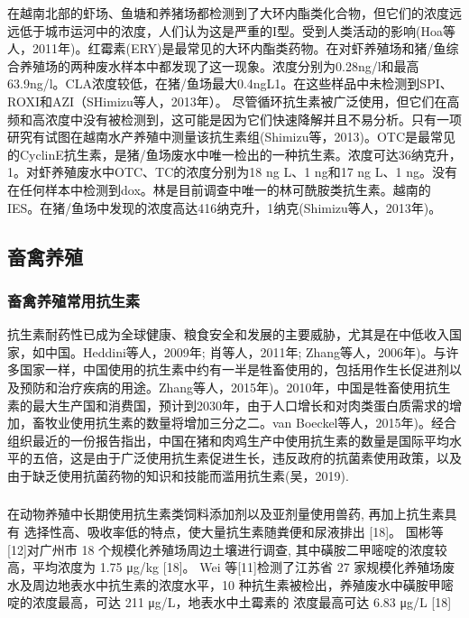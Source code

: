 \documentclass{SCIS2020cn}
\begin{document}
在越南北部的虾场、鱼塘和养猪场都检测到了大环内酯类化合物，但它们的浓度远远低于城市运河中的浓度，人们认为这是严重的I型。受到人类活动的影响(Hoa等人，2011年)。红霉素(ERY)是最常见的大环内酯类药物。在对虾养殖场和猪/鱼综合养殖场的两种废水样本中都发现了这一现象。浓度分别为0.28ng/l和最高63.9ng/l。CLA浓度较低，在猪/鱼场最大0.4ngL1。在这些样品中未检测到SPI、ROXI和AZI（SHimizu等人，2013年）。
尽管循环抗生素被广泛使用，但它们在高频和高浓度中没有被检测到，这可能是因为它们快速降解并且不易分析。只有一项研究有试图在越南水产养殖中测量该抗生素组(Shimizu等，2013)。OTC是最常见的CyclinE抗生素，是猪/鱼场废水中唯一检出的一种抗生素。浓度可达36纳克升，1。对虾养殖废水中OTC、TC的浓度分别为18 ng L、1 ng和17 ng L、1 ng。没有在任何样本中检测到dox。林是目前调查中唯一的林可酰胺类抗生素。越南的IES。在猪/鱼场中发现的浓度高达416纳克升，1纳克(Shimizu等人，2013年)。




\subsection{畜禽养殖}
\subsubsection{畜禽养殖常用抗生素}
抗生素耐药性已成为全球健康、粮食安全和发展的主要威胁，尤其是在中低收入国家，如中国。Heddini等人，2009年; 肖等人，2011年; Zhang等人，2006年)。与许多国家一样，中国使用的抗生素中约有一半是牲畜使用的，包括用作生长促进剂以及预防和治疗疾病的用途。Zhang等人，2015年)。2010年，中国是牲畜使用抗生素的最大生产国和消费国，预计到2030年，由于人口增长和对肉类蛋白质需求的增加，畜牧业使用抗生素的数量将增加三分之二。van Boeckel等人，2015年)。经合组织最近的一份报告指出，中国在猪和肉鸡生产中使用抗生素的数量是国际平均水平的五倍，这是由于广泛使用抗生素促进生长，违反政府的抗菌素使用政策，以及由于缺乏使用抗菌药物的知识和技能而滥用抗生素(吴，2019).
\subsubsection{}
在动物养殖中长期使用抗生素类饲料添加剂以及亚剂量使用兽药, 再加上抗生素具有 选择性高、吸收率低的特点，使大量抗生素随粪便和尿液排出 [18]。 国彬等[12]对广州市 18 个规模化养殖场周边土壤进行调查, 其中磺胺二甲嘧啶的浓度较高，平均浓度为 1.75 μg/kg [18]。 Wei 等[11]检测了江苏省 27 家规模化养殖场废水及周边地表水中抗生素的浓度水平，10 种抗生素被检出，养殖废水中磺胺甲嘧啶的浓度最高，可达 211 μg/L，地表水中土霉素的 浓度最高可达 6.83 μg/L [18]
\end{document}

